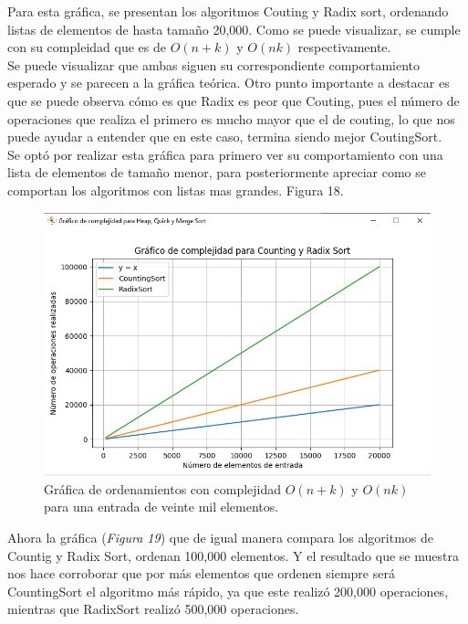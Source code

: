 \documentclass[a4paper,12pt]{article}
\begin{document}
Para esta gráfica, se presentan los algoritmos Couting y Radix sort, ordenando listas de elementos de hasta tamaño 20,000. Como se puede visualizar, se cumple con su compleidad que es de $O(n+k)$ y $O(nk)$ respectivamente.\\

Se puede visualizar que ambas siguen su correspondiente comportamiento esperado y se parecen a la gráfica teórica. Otro punto importante a destacar es que se puede observa cómo es que Radix es peor que Couting, pues el número de operaciones que realiza el primero es mucho mayor que el de couting, lo que nos puede ayudar a entender que en este caso, termina siendo mejor CoutingSort.\\

Se optó por realizar esta gráfica para primero ver su comportamiento con una lista de elementos de tamaño menor, para posteriormente apreciar como se comportan los algoritmos con listas mas grandes. Figura 18.

\begin{figure}[h]
    \centering
    \includegraphics[width=1\textwidth]{media/graficaC_20k.png}
    \caption{Gráfica de ordenamientos con complejidad  $O(n+k)$ y $O(nk)$ para una entrada de veinte mil elementos.}
    \label{fig:grafC_20k}
\end{figure}

Ahora la gráfica (\textit{Figura 19}) que de igual manera compara los algoritmos de Countig y Radix Sort, ordenan 100,000 elementos. Y el resultado que se muestra nos hace corroborar que por más elementos que ordenen siempre será CountingSort el algoritmo más rápido, ya que este realizó 200,000 operaciones, mientras que RadixSort realizó 500,000 operaciones. \\
\end{document}
